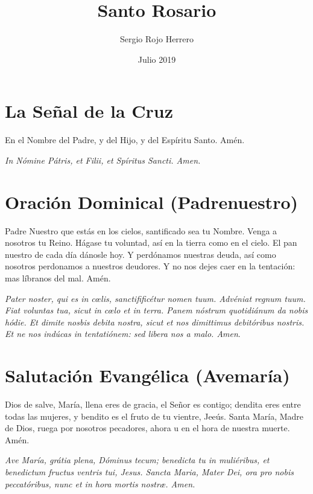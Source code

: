 \documentclass[a4paper,11pt, oneside]{report}
\title{Santo Rosario}
\author{Sergio Rojo Herrero}
\date{Julio 2019}
\begin{document}
  
  \begin{titlepage}
    \maketitle    
  \end{titlepage}

  \section*{La Señal de la Cruz}
    En el Nombre del Padre, y del Hijo, y del Espíritu Santo. Amén.

    \medskip

    \textit{In Nómine Pátris, et Filii, et Spíritus Sancti. Amen.}

  \section*{Oración Dominical (Padrenuestro)}
    
    Padre Nuestro que estás en los cielos, santificado sea tu Nombre. Venga a nosotros tu Reino. Hágase tu voluntad, así en la tierra como
    en el cielo. El pan nuestro de cada día dánosle hoy. Y perdónamos nuestras deuda, así como nosotros perdonamos a nuestros deudores.
    Y no nos dejes caer en la tentación: mas líbranos del mal. Amén.
    
    \medskip

    \textit{Pater noster, qui es in c{\oe}lis, sanctifificétur nomen tuum. Advéniat regnum tuum. Fiat voluntas tua, sicut in c{\oe}lo et in terra.
    Panem nóstrum quotidiánum da nobis hódie. Et dimite nosbis debita nostra, sicut et nos dimittimus debitóribus nostris. Et ne nos indúcas
    in tentatiónem: sed libera nos a malo. Amen}.

  \section*{Salutación Evangélica (Avemaría)}
    Dios de salve, María, llena eres de gracia, el Señor es contigo; dendita eres entre todas las mujeres, y bendito es el fruto de tu
    vientre, Jeeús. Santa María, Madre de Dios, ruega por nosotros pecadores, ahora u en el hora de nuestra muerte. Amén.
    
    \medskip

    \textit{Ave María, grátia plena, Dóminus tecum; benedicta tu in muliéribus, et benedictum fructus ventris tui, Jesus.
    Sancta Maria, Mater Dei, ora pro nobis peccatóribus, nunc et in hora mortis nostr{\ae}. Amen.}
\end{document}
